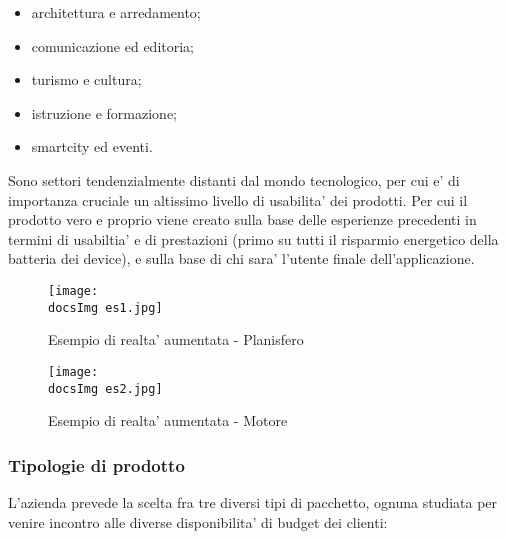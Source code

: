 \begin{itemize}
	\item architettura e arredamento;
	\item comunicazione ed editoria;
	\item turismo e cultura;
	\item istruzione e formazione;
	\item smartcity ed eventi.
\end{itemize}

Sono settori tendenzialmente distanti dal mondo tecnologico, per cui e' di importanza cruciale un altissimo livello di usabilita' dei prodotti. Per cui il prodotto vero e proprio viene creato sulla base delle esperienze precedenti in termini di usabiltia' e di prestazioni (primo su tutti il risparmio energetico della batteria dei device), e sulla base di chi sara' l'utente finale dell'applicazione.

\begin{figure}[H]
	\centering
	\texttt{[image: \\docsImg es1.jpg]}
	\caption{Esempio di realta' aumentata - Planisfero}
	\label{fig:Esempio di realta' aumentata presente nell'app Experenti - Planisfero}
\end{figure}

\begin{figure}[H]
	\centering
	\texttt{[image: \\docsImg es2.jpg]}
	\caption{Esempio di realta' aumentata - Motore}
	\label{fig:Esempio di realta' aumentata presente nell'app Experenti - Motore}
\end{figure}


\subsubsection{Tipologie di prodotto}
L'azienda prevede la scelta fra tre diversi tipi di pacchetto, ognuna studiata per venire incontro alle diverse disponibilita' di budget dei clienti:


